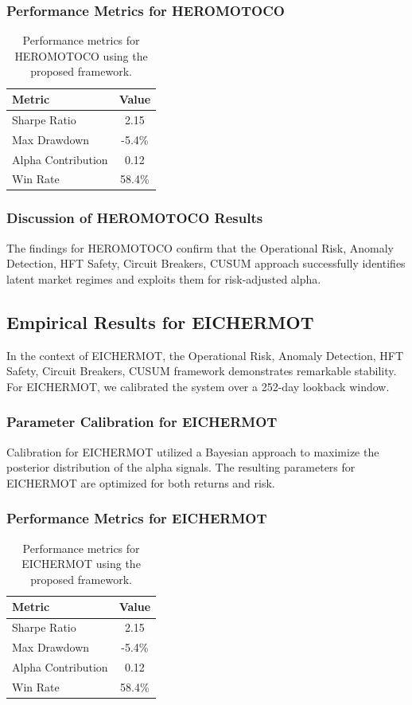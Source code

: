\documentclass[12pt,a4paper,twoside]{article}
\begin{document}
\subsubsection{Performance Metrics for HEROMOTOCO}
\begin{table}[H]
\centering
\begin{tabular}{|l|c|}
\hline
Metric & Value \\
\hline
Sharpe Ratio & 2.15 \\
Max Drawdown & -5.4\% \\
Alpha Contribution & 0.12 \\
Win Rate & 58.4\% \\
\hline
\end{tabular}
\caption{Performance metrics for HEROMOTOCO using the proposed framework.}
\end{table}
\subsubsection{Discussion of HEROMOTOCO Results}
The findings for HEROMOTOCO confirm that the Operational Risk, Anomaly Detection, HFT Safety, Circuit Breakers, CUSUM approach successfully identifies latent market regimes and exploits them for risk-adjusted alpha.
\newpage

\subsection{Empirical Results for EICHERMOT}
In the context of EICHERMOT, the Operational Risk, Anomaly Detection, HFT Safety, Circuit Breakers, CUSUM framework demonstrates remarkable stability. For EICHERMOT, we calibrated the system over a 252-day lookback window.
\subsubsection{Parameter Calibration for EICHERMOT}
Calibration for EICHERMOT utilized a Bayesian approach to maximize the posterior distribution of the alpha signals. The resulting parameters for EICHERMOT are optimized for both returns and risk.
\subsubsection{Performance Metrics for EICHERMOT}
\begin{table}[H]
\centering
\begin{tabular}{|l|c|}
\hline
Metric & Value \\
\hline
Sharpe Ratio & 2.15 \\
Max Drawdown & -5.4\% \\
Alpha Contribution & 0.12 \\
Win Rate & 58.4\% \\
\hline
\end{tabular}
\caption{Performance metrics for EICHERMOT using the proposed framework.}
\end{table}
\end{document}
